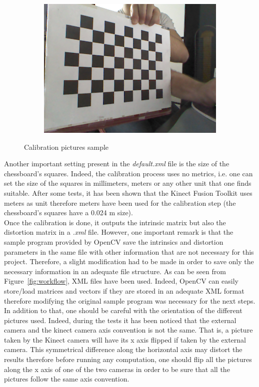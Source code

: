 \begin{figure}
\begin{subfigure}{.5\textwidth}
\end{subfigure}
\begin{subfigure}{.5\textwidth}
  \centering
  \includegraphics[width=0.8\linewidth]{images/calib4.png}
\end{subfigure}
\caption{Calibration pictures sample}
\label{fig:calibration pictures}
\end{figure}

Another important setting present in the \textit{default.xml} file is the size of the chessboard's squares. Indeed, the calibration process uses no metrics, i.e. one can set the size of the squares in millimeters, meters or any other unit that one finds suitable. After some tests, it has been shown that the Kinect Fusion Toolkit uses meters as unit therefore meters have been used for the calibration step (the chessboard's squares have a 0.024 m size).\\

Once the calibration is done, it outputs the intrinsic matrix but also the distortion matrix in a \textit{.xml} file. However, one important remark is that the sample program provided by OpenCV save the intrinsics and distortion parameters in the same file with other information that are not necessary for this project. Therefore, a slight modification had to be made in order to save only the necessary information in an adequate file structure. As can be seen from Figure~\ref{fig:workflow}, XML files have been used. Indeed, OpenCV can easily store/load matrices and vectors if they are stored in an adequate XML format therefore modifying the original sample program was necessary for the next steps. \\

In addition to that, one should be careful with the orientation of the different pictures used. Indeed, during the tests it has been noticed that the external camera and the kinect camera axis convention is not the same. That is, a picture taken by the Kinect camera will have its x axis flipped if taken by the external camera. This symmetrical difference along the horizontal axis may distort the results therefore before running any computation, one should flip all the pictures along the x axis of one of the two cameras in order to be sure that all the pictures follow the same axis convention.\\

